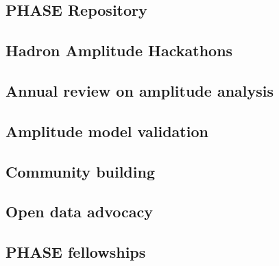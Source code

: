 \subsection{PHASE Repository}

\subsection{Hadron Amplitude Hackathons}

\subsection{Annual review on amplitude analysis}

\subsection{Amplitude model validation}

\subsection{Community building}

\subsection{Open data advocacy}

\subsection{PHASE fellowships}